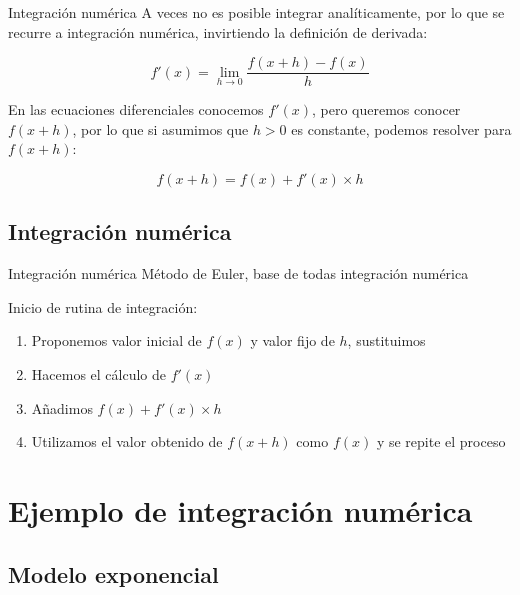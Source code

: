 \documentclass[
  11pt,
  ignorenonframetext,
]{beamer}
\begin{document}
\begin{frame}{Integración numérica}
A veces no es posible integrar analíticamente, por lo que se recurre a
integración numérica, invirtiendo la definición de derivada:

\[f'(x) = \lim_{h \rightarrow 0} \frac{f(x + h) - f(x)}{h}\]

En las ecuaciones diferenciales conocemos \(f'(x)\), pero queremos
conocer \(f(x + h)\), por lo que si asumimos que \(h > 0\) es constante,
podemos resolver para \(f(x + h)\):

\[f(x + h) = f(x) + f'(x) \times h\]
\end{frame}

\hypertarget{integraciuxf3n-numuxe9rica-1}{%
\subsection{Integración numérica}\label{integraciuxf3n-numuxe9rica-1}}

\begin{frame}{Integración numérica}
Método de Euler, base de todas integración numérica

Inicio de rutina de integración:

\begin{enumerate}
\item
  Proponemos valor inicial de \(f(x)\) y valor fijo de \(h\),
  sustituimos
\item
  Hacemos el cálculo de \(f'(x)\)
\item
  Añadimos \(f(x) + f'(x) \times h\)
\item
  Utilizamos el valor obtenido de \(f(x + h)\) como \(f(x)\) y se repite
  el proceso
\end{enumerate}
\end{frame}

\hypertarget{ejemplo-de-integraciuxf3n-numuxe9rica}{%
\section{Ejemplo de integración
numérica}\label{ejemplo-de-integraciuxf3n-numuxe9rica}}

\hypertarget{modelo-exponencial-1}{%
\subsection{Modelo exponencial}\label{modelo-exponencial-1}}
\end{document}
